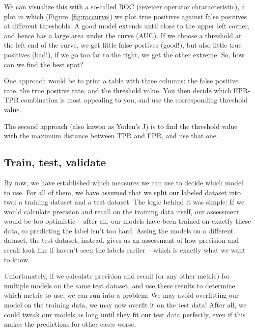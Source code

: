 We can visualize this with a so-called ROC (reveicer operator
chraracteristic), a plot in which (Figure~\ref{fig:roccurve}) we plot
true positives against false positives at different thresholds.  A
good model extends until close to the upper left corner, and hence has
a large area under the curve (AUC).  If we choose a threshold at the
left end of the curve, we get little false postives (good!), but also
little true positives (bad!), if we go too far to the right, we get
the other extreme. So, how can we find the best spot?

One approach would be to print a table with three columns: the false
positive rate, the true positive rate, and the threshold value. You
then decide which FPR-TPR combination is most appealing to you, and
use the corresponding threshold value.

The second approach (also knwon as Yoden's J) is to find the threshold
value with the maximum distance between TPR and FPR, and use that one.




\subsection{Train, test, validate}
By now, we have established which measures we can use to decide which
model to use. For all of them, we have assumed that we split our
labeled dataset into two: a training dataset and a test dataset. The
logic behind it was simple: If we would calculate precision and recall
on the training data itself, our assessment would be too optimistic --
after all, our models have been trained on exactly these data, so
predicting the label isn't too hard. Assing the models on a different
dataset, the test dataset, instead, gives us an assessment of how
precision and recall look like if haven't seen the labels earlier --
which is exactly what we want to know.

Unfortunately, if we calculate precision and recall (or any other
metric) for multiple models on the same test dataset, and use these
results to determine which metric to use, we can run into a problem:
We may avoid overfitting our model on the training data, we may now
overfit it on the test data! After all, we could tweak our models as
long until they fit our test data perfectly, even if this makes the
predictions for other cases worse.

